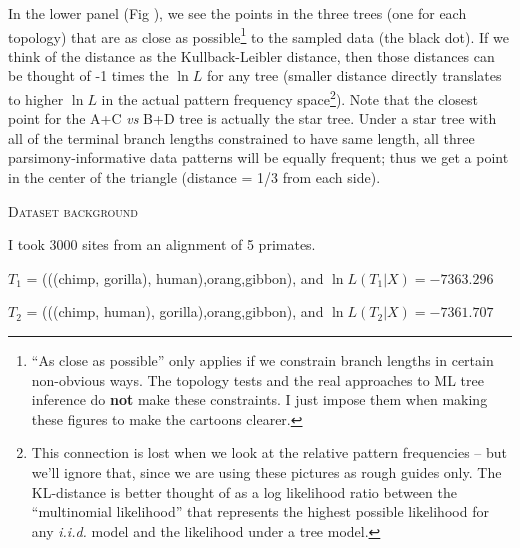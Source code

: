 \documentclass[11pt]{article}
\renewcommand{\section}[2]{%
\bigskip
\begin{center}
\begin{Large}
\normalfont\scshape #2
\medskip
\end{Large}
\end{center}}
\newcommand{\lnL}{\ln L}
\begin{document}
In the lower panel (Fig ), we see the points in the three trees (one for each topology) that are as close as possible\footnote{``As close as possible'' only applies if we constrain branch lengths in certain non-obvious ways. The topology tests and the real approaches to ML tree inference do {\bf not} make these constraints. I just impose them when making these figures to make the cartoons clearer.} to the sampled data (the black dot).
If we think of the distance as the Kullback-Leibler distance, then those distances can be thought of -1 times the $\lnL$ for any tree (smaller distance directly translates to higher $\lnL$ in the actual pattern frequency space\footnote{This connection is lost when we look at the relative pattern frequencies -- but we'll ignore that, since we are using these pictures as rough guides only. The KL-distance is better thought of as a log likelihood ratio between the ``multinomial likelihood'' \citep[{\em aka} the ``unconstrained likelihood'' of][]{Goldman1993} that represents the highest possible likelihood for any {\em i.i.d.} model and the likelihood under a tree model.}).
Note that the closest point for the A+C {\em vs} B+D tree is actually the star tree.
Under a star tree with all of the terminal branch lengths constrained to have same length, all three parsimony-informative data patterns will be equally frequent; thus we get a point in the center of the triangle (distance = 1/3 from each side).


\newpage
\section*{Dataset background}
I took 3000 sites from an alignment of 5 primates.

$T_1$ = (((chimp, gorilla), human),orang,gibbon), and $\ln L(T_1|X) = -7363.296$\par
$T_2$ = (((chimp, human), gorilla),orang,gibbon), and $\ln L(T_2|X) = -7361.707$\par
\end{document}
